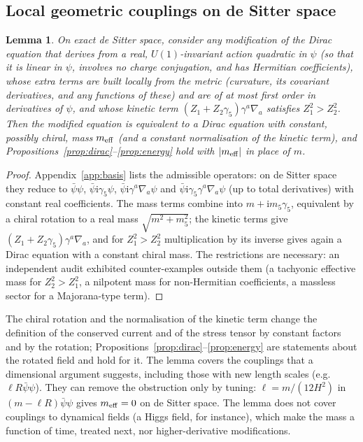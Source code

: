 \documentclass[11pt,a4paper]{article}
\newtheorem{lemma}{Lemma}
\theoremstyle{definition}
\newcommand{\ii}{\mathrm{i}}
\begin{document}
\subsection{Local geometric couplings on de Sitter space}
\label{sec:coupling}

\begin{lemma}
\label{lem:coupling}
On exact de Sitter space, consider any modification of the Dirac equation that derives from a real, $U(1)$-invariant action quadratic in $\psi$ (so that it is linear in $\psi$, involves no charge conjugation, and has Hermitian coefficients), whose extra terms are built locally from the metric (curvature, its covariant derivatives, and any functions of these) and are of at most first order in derivatives of $\psi$, and whose kinetic term $(Z_{1}+Z_{2}\gamma_{5})\gamma^{a}\nabla_{a}$ satisfies $Z_{1}^{2}>Z_{2}^{2}$. Then the modified equation is equivalent to a Dirac equation with constant, possibly chiral, mass $m_{\rm eff}$ (and a constant normalisation of the kinetic term), and Propositions~\ref{prop:dirac}--\ref{prop:energy} hold with $|m_{\rm eff}|$ in place of $m$.
\end{lemma}
\begin{proof}
Appendix~\ref{app:basis} lists the admissible operators: on de Sitter space they reduce to $\bar\psi\psi$, $\bar\psi\ii\gamma_{5}\psi$, $\bar\psi\ii\gamma^{a}\nabla_{a}\psi$ and $\bar\psi\ii\gamma_{5}\gamma^{a}\nabla_{a}\psi$ (up to total derivatives) with constant real coefficients. The mass terms combine into $m+\ii m_{5}\gamma_{5}$, equivalent by a chiral rotation to a real mass $\sqrt{m^{2}+m_{5}^{2}}$; the kinetic terms give $(Z_{1}+Z_{2}\gamma_{5})\gamma^{a}\nabla_{a}$, and for $Z_{1}^{2}>Z_{2}^{2}$ multiplication by its inverse gives again a Dirac equation with a constant chiral mass. The restrictions are necessary: an independent audit exhibited counter-examples outside them (a tachyonic effective mass for $Z_{2}^{2}>Z_{1}^{2}$, a nilpotent mass for non-Hermitian coefficients, a massless sector for a Majorana-type term).
\end{proof}

The chiral rotation and the normalisation of the kinetic term change the definition of the conserved current and of the stress tensor by constant factors and by the rotation; Propositions~\ref{prop:dirac}--\ref{prop:energy} are statements about the rotated field and hold for it. The lemma covers the couplings that a dimensional argument suggests, including those with new length scales (e.g.\ $\ell R\bar\psi\psi$). They can remove the obstruction only by tuning: $\ell=m/(12H^{2})$ in $(m-\ell R)\bar\psi\psi$ gives $m_{\rm eff}=0$ on de Sitter space. The lemma does not cover couplings to dynamical fields (a Higgs field, for instance), which make the mass a function of time, treated next, nor higher-derivative modifications.
\end{document}
